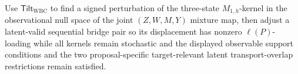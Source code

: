 Use \(\mathsf{Tilt}_{\mathrm{WBC}}\) to find a signed perturbation of the three-state \(M_{1,h}\)-kernel in the observational null space of the joint \((Z,W,M,Y)\) mixture map, then adjust a latent-valid sequential bridge pair so its displacement has nonzero \(\ell(P)\)-loading while all kernels remain stochastic and the displayed observable support conditions and the two proposal-specific target-relevant latent transport-overlap restrictions remain satisfied.